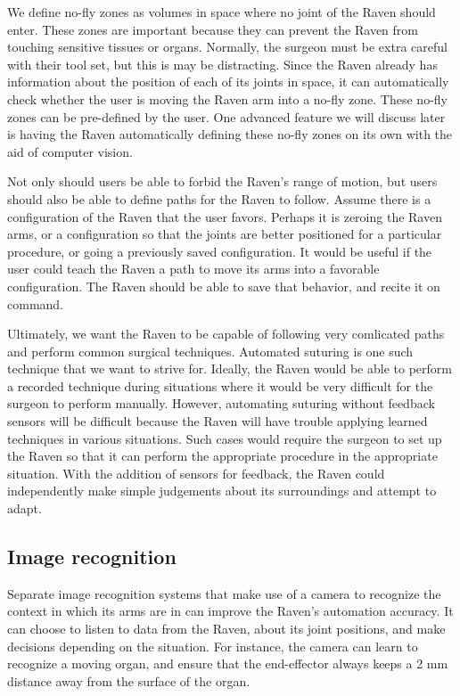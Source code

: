 \documentclass[letterpaper,twocolumn,10pt]{article}
\begin{document}
We define no-fly zones as volumes in space where no joint of the Raven 
should enter. These zones are important because they can prevent the 
Raven from touching sensitive tissues or organs. Normally, the surgeon 
must be extra careful with their tool set, but this is may be 
distracting. Since the Raven already has information about 
the position of each of its joints in space, it can automatically 
check whether the user is moving the Raven arm into a no-fly zone. 
These no-fly zones can be pre-defined by the user. One advanced 
feature we will discuss later is having the Raven automatically defining 
these no-fly zones on its own with the aid of computer vision.

Not only should users be able to forbid the Raven's range of motion, 
but users should also be able to define 
paths for the Raven to follow. Assume there is a configuration of 
the Raven that the user favors. Perhaps it is zeroing the Raven arms, 
or a configuration so that the joints are better positioned for a 
particular procedure, or going a previously saved configuration. 
It would be useful if the user could teach the Raven a path to move 
its arms into a favorable configuration. The Raven should be able to 
save that behavior, and recite it on command.

Ultimately, we want the Raven to be capable of following very 
comlicated paths and perform common surgical techniques. Automated 
suturing is one such technique that we want to strive for. Ideally, 
the Raven would be able to perform a recorded technique  
during situations where it would be very difficult 
for the surgeon to perform manually. However, automating suturing 
without feedback sensors will be difficult because the Raven will 
have trouble applying learned techniques in various situations. 
Such cases would require the surgeon to set up the Raven so that it can 
perform the appropriate procedure in the appropriate situation. With 
the addition of sensors for feedback, the Raven could independently make 
simple judgements about its surroundings and attempt to adapt.

\subsection{Image recognition}
Separate image recognition systems that make use of a camera to 
recognize the context in which its arms are in can improve the 
Raven's automation accuracy. It can choose to listen to data from 
the Raven, about its joint positions, and make decisions depending 
on the situation. For instance, the camera can learn to recognize 
a moving organ, and ensure that the end-effector always keeps a 
2 mm distance away from the surface of the organ.
\end{document}
